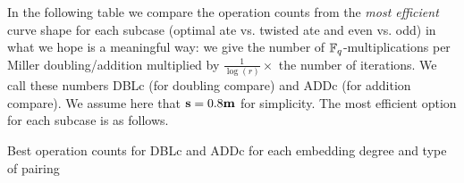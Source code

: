 In the following table we compare the operation counts from the \emph{most efficient} 
curve shape for each subcase
(optimal ate vs. twisted ate and even vs. odd)
in what we hope is a meaningful way:
we give the number of $\mathbb{F}_{q}$-multiplications per Miller doubling/addition multiplied by 
$\frac{1}{\log(r)} \times $ the number of iterations. We call these numbers DBLc 
(for doubling compare) and ADDc (for addition compare).
We assume here that $\textbf{s} = 0.8\textbf{m}$ for simplicity.
The most efficient option for each subcase is as follows.

\begin{table}[h]
\centering
\caption{Best operation counts for DBLc and ADDc for each embedding degree and type of pairing}


\end{table}
